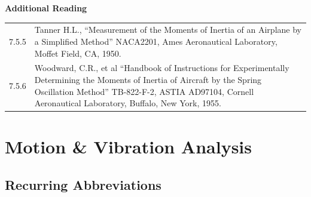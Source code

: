 \documentclass[
]{book}
\begin{document}
\textbf{Additional Reading}

\begin{longtable}[]{@{}ll@{}}
\toprule
\endhead
\begin{minipage}[t]{0.05\columnwidth}\raggedright
7.5.5\strut
\end{minipage} & \begin{minipage}[t]{0.89\columnwidth}\raggedright
Tanner H.L., ``Measurement of the Moments of Inertia of an Airplane by a Simplified Method'' NACA2201, Ames Aeronautical Laboratory, Moffet Field, CA, 1950.\strut
\end{minipage}\tabularnewline
\begin{minipage}[t]{0.05\columnwidth}\raggedright
7.5.6\strut
\end{minipage} & \begin{minipage}[t]{0.89\columnwidth}\raggedright
Woodward, C.R., et al ``Handbook of Instructions for Experimentally Determining the Moments of Inertia of Aircraft by the Spring Oscillation Method'' TB-822-F-2, ASTIA AD97104, Cornell Aeronautical Laboratory, Buffalo, New York, 1955.\strut
\end{minipage}\tabularnewline
\bottomrule
\end{longtable}

\hypertarget{motion-vibration-analysis}{%
\chapter{Motion \& Vibration Analysis}\label{motion-vibration-analysis}}

\hypertarget{recurring-abbreviations}{%
\section{Recurring Abbreviations}\label{recurring-abbreviations}}
\end{document}
